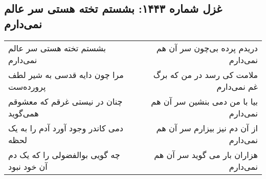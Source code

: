 \begin{center}
\section*{غزل شماره ۱۴۴۳: بشستم تخته هستی سر عالم نمی‌دارم}
\label{sec:1443}
\begin{longtable}{l p{0.5cm} r}
بشستم تخته هستی سر عالم نمی‌دارم
&&
دریدم پرده بی‌چون سر آن هم نمی‌دارم
\\
مرا چون دایه قدسی به شیر لطف پرورده‌ست
&&
ملامت کی رسد در من که برگ غم نمی‌دارم
\\
چنان در نیستی غرقم که معشوقم همی‌گوید
&&
بیا با من دمی بنشین سر آن هم نمی‌دارم
\\
دمی کاندر وجود آورد آدم را به یک لحظه
&&
از آن دم نیز بیزارم سر آن هم نمی‌دارم
\\
چه گویی بوالفضولی را که یک دم آن خود نبود
&&
هزاران بار می گوید سر آن هم نمی‌دارم
\\
\end{longtable}
\end{center}
